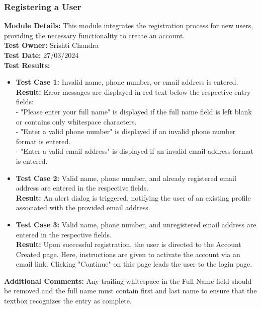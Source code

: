 \documentclass[11pt]{article}
\begin{document}
\subsubsection{Registering a User}
\textbf{Module Details: }This module integrates the registration process for new users, providing the necessary functionality to create an account.
\\
\textbf{Test Owner: }Srishti Chandra
\\
\textbf{Test Date: }27/03/2024
\\
\textbf{Test Results: }
\begin{itemize}
    \item \textbf{Test Case 1: }Invalid name, phone number, or email address is entered.
    \\
    \textbf{Result: }Error messages are displayed in red text below the respective entry fields:
    \\
    - "Please enter your full name" is displayed if the full name field is left blank or contains only whitespace characters.
    \\
    - "Enter a valid phone number" is displayed if an invalid phone number format is entered.
    \\
    - "Enter a valid email address" is displayed if an invalid email address format is entered.

    \item \textbf{Test Case 2: }Valid name, phone number, and already registered email address are entered in the respective fields.
    \\
    \textbf{Result: }An alert dialog is triggered, notifying the user of an existing profile associated with the provided email address.

    \item \textbf{Test Case 3: }Valid name, phone number, and unregistered email address are entered in the respective fields.
    \\
    \textbf{Result: }Upon successful registration, the user is directed to the Account Created page. Here, instructions are given to activate the account via an email link. Clicking "Continue" on this page leads the user to the login page.

\end{itemize}
\textbf{Additional Comments: }Any trailing whitespace in the Full Name field should be removed and the full name must contain first and last name to ensure that the textbox recognizes the entry as complete.
\end{document}
